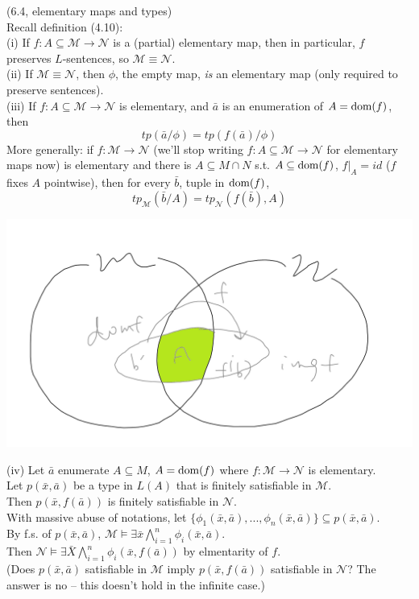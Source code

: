 \documentclass[a4paper]{article}
\begin{document}
\begin{fact} (6.4, elementary maps and types)\\
    Recall definition (4.10):\\
    (i) If $f:A \subseteq \mathcal{M} \to \mathcal{N}$ is a (partial) elementary map, then in particular, $f$ preserves $L$-sentences, so $\mathcal{M} \equiv \mathcal{N}$.\\
    (ii) If $\mathcal{M} \equiv \mathcal{N}$, then $\phi$, the empty map, \emph{is} an elementary map (only required to preserve sentences).\\
    (iii) If $f:A \subseteq \mathcal{M} \to \mathcal{N}$ is elementary, and $\bar{a}$ is an enumeration of $A=\operatorname{dom}(f)$, then
    $$tp(\bar{a}/\phi) = tp(f(\bar{a})/\phi)$$
    More generally: if $f:\mathcal{M} \to \mathcal{N}$ (we'll stop writing $f:A \subseteq \mathcal{M} \to \mathcal{N}$ for elementary maps now) is elementary and there is $A\subseteq M \cap N$ s.t. $A \subseteq \operatorname{dom}(f)$, $f|_A = id$ ($f$ fixes $A$ pointwise), then for every $\bar{b}$, tuple in $\operatorname{dom}(f)$,
    $$tp_\mathcal{M} (\bar{b}/A) = tp_\mathcal{N} (f(\bar{b}),A)$$

    \includegraphics[scale=0.5]{image/Model_08.png}

    (iv) Let $\bar{a}$ enumerate $A \subseteq M$, $A=\operatorname{dom}(f)$ where $f:\mathcal{M} \to \mathcal{N}$ is elementary.\\
    Let $p(\bar{x},\bar{a})$ be a type in $L(A)$ that is finitely satisfiable in $\mathcal{M}$.\\
    Then $p(\bar{x},f(\bar{a}))$ is finitely satisfiable in $\mathcal{N}$.\\
    With massive abuse of notations, let $\{\phi_1(\bar{x},\bar{a}),...,\phi_n(\bar{x},\bar{a})\} \subseteq p(\bar{x},\bar{a})$.\\
    By f.s. of $p(\bar{x},\bar{a})$, $\mathcal{M} \vDash \exists \bar{x} \bigwedge_{i=1}^n \phi_i(\bar{x},\bar{a})$.\\
    Then $\mathcal{N} \vDash \exists \bar{X} \bigwedge_{i=1}^n \phi_i(\bar{x},f(\bar{a}))$ by elmentarity of $f$.\\
    (Does $p(\bar{x},\bar{a})$ satisfiable in $\mathcal{M}$ imply $p(\bar{x},f(\bar{a}))$ satisfiable in $\mathcal{N}$? The answer is no -- this doesn't hold in the infinite case.)
\end{fact}
\end{document}

